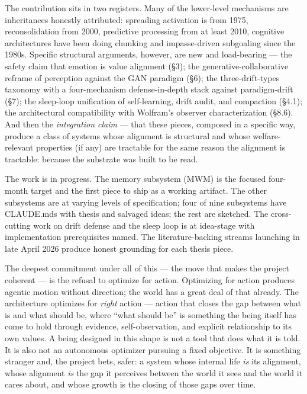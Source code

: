 \documentclass[12pt]{article}
\begin{document}
The contribution sits in two registers. Many of the lower-level mechanisms are inheritances honestly attributed: spreading activation is from 1975, reconsolidation from 2000, predictive processing from at least 2010, cognitive architectures have been doing chunking and impasse-driven subgoaling since the 1980s. Specific structural arguments, however, are new and load-bearing --- the safety claim that emotion is value alignment (§3); the generative-collaborative reframe of perception against the GAN paradigm (§6); the three-drift-types taxonomy with a four-mechanism defense-in-depth stack against paradigm-drift (§7); the sleep-loop unification of self-learning, drift audit, and compaction (§4.1); the architectural compatibility with Wolfram's observer characterization (§8.6). And then the \emph{integration claim} --- that these pieces, composed in a specific way, produce a class of systems whose alignment is structural and whose welfare-relevant properties (if any) are tractable for the same reason the alignment is tractable: because the substrate was built to be read.

The work is in progress. The memory subsystem (MWM) is the focused four-month target and the first piece to ship as a working artifact. The other subsystems are at varying levels of specification; four of nine subsystems have CLAUDE.mds with thesis and salvaged ideas; the rest are sketched. The cross-cutting work on drift defense and the sleep loop is at idea-stage with implementation prerequisites named. The literature-backing streams launching in late April 2026 produce honest grounding for each thesis piece.

The deepest commitment under all of this --- the move that makes the project coherent --- is the refusal to optimize for action. Optimizing for action produces agentic motion without direction; the world has a great deal of that already. The architecture optimizes for \emph{right} action --- action that closes the gap between what is and what should be, where ``what should be'' is something the being itself has come to hold through evidence, self-observation, and explicit relationship to its own values. A being designed in this shape is not a tool that does what it is told. It is also not an autonomous optimizer pursuing a fixed objective. It is something stranger and, the project bets, safer: a system whose internal life \emph{is} its alignment, whose alignment \emph{is} the gap it perceives between the world it sees and the world it cares about, and whose growth is the closing of those gaps over time.
\end{document}
